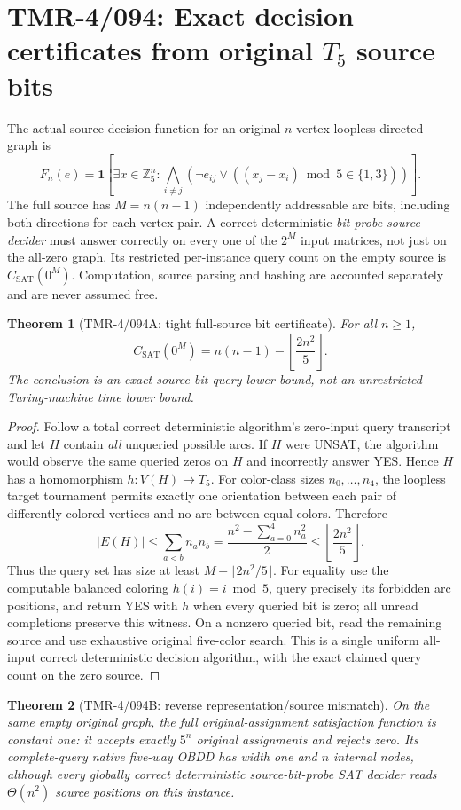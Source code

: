 \documentclass[11pt]{article}
\newtheorem{theorem}{Theorem}
\begin{document}
\section{TMR-4/094: Exact decision certificates from original $T_5$ source bits}
\label{sec:t5source094}
The actual source decision function for an original $n$-vertex loopless
directed graph is
\[
F_n(e)=\mathbf1\left[\exists x\in\mathbb Z_5^n:
\bigwedge_{i\ne j}(\neg e_{ij}\lor
((x_j-x_i)\bmod5\in\{1,3\}))\right].
\]
The full source has $M=n(n-1)$ independently addressable arc bits,
including both directions for each vertex pair. A correct deterministic
\emph{bit-probe source decider} must answer correctly on every one of the
$2^M$ input matrices, not just on the all-zero graph. Its restricted
per-instance query count on the empty source is
$C_{\mathrm{SAT}}(0^M)$. Computation, source parsing and hashing are
accounted separately and are never assumed free.
\begin{theorem}[TMR-4/094A: tight full-source bit certificate]
For all $n\ge1$,
\[
\boxed{C_{\mathrm{SAT}}(0^M)=n(n-1)-
\left\lfloor\frac{2n^2}{5}\right\rfloor.}
\]
The conclusion is an exact source-bit query lower bound, not an
unrestricted Turing-machine time lower bound.
\end{theorem}
\begin{proof}
Follow a total correct deterministic algorithm's zero-input query
transcript and let $H$ contain \emph{all} unqueried possible arcs.
If $H$ were UNSAT, the algorithm would observe the same queried zeros
on $H$ and incorrectly answer YES. Hence $H$ has a homomorphism
$h:V(H)\to T_5$. For color-class sizes $n_0,\ldots,n_4$,
the loopless target tournament permits exactly one orientation
between each pair of differently colored vertices and no arc between
equal colors. Therefore
\[
|E(H)|\le \sum_{a<b}n_an_b
=\frac{n^2-\sum_{a=0}^4n_a^2}{2}
\le\left\lfloor\frac{2n^2}{5}\right\rfloor.
\]
Thus the query set has size at least $M-\lfloor2n^2/5\rfloor$.
For equality use the computable balanced coloring $h(i)=i\bmod5$,
query precisely its forbidden arc positions, and return YES with $h$
when every queried bit is zero; all unread completions preserve this
witness. On a nonzero queried bit, read the remaining source and use
exhaustive original five-color search. This is a single uniform
all-input correct deterministic decision algorithm, with the exact
claimed query count on the zero source.
\end{proof}
\begin{theorem}[TMR-4/094B: reverse representation/source mismatch]
On the same empty original graph, the full original-assignment
satisfaction function is constant one: it accepts exactly $5^n$
original assignments and rejects zero. Its complete-query native
five-way OBDD has width one and $n$ internal nodes, although every
globally correct deterministic source-bit-probe SAT decider reads
$\Theta(n^2)$ source positions on this instance.
\end{theorem}
\end{document}
